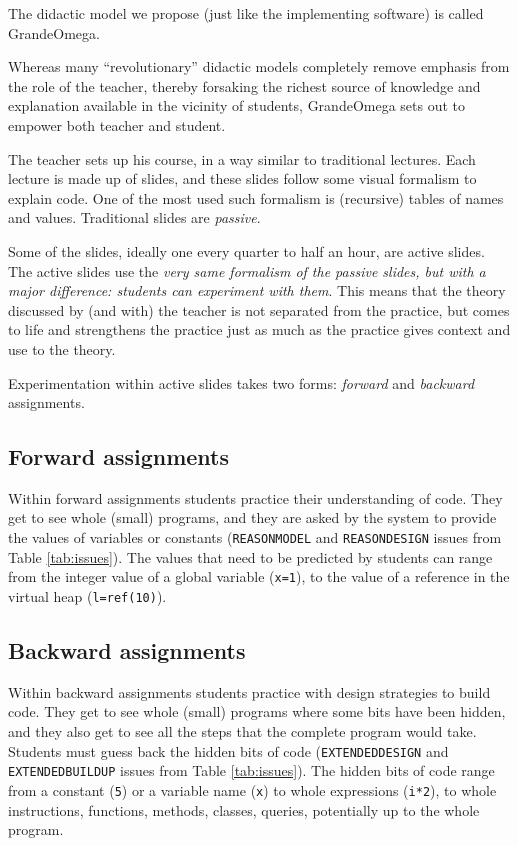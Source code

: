 The didactic model we propose (just like the implementing software) is called GrandeOmega.

Whereas many “revolutionary” didactic models completely remove emphasis from the role of the teacher, thereby forsaking the richest source of knowledge and explanation available in the vicinity of students, GrandeOmega sets out to empower both teacher and student. 

The teacher sets up his course, in a way similar to traditional lectures. Each lecture is made up of slides, and these slides follow some visual formalism to explain code. One  of the most used such formalism is (recursive) tables of names and values. Traditional slides are \textit{passive}.

Some of the slides, ideally one every quarter to half an hour, are active slides. The active slides use the \textit{very same formalism of the passive slides, but with a major difference: students can experiment with them}. This means that the theory discussed by (and with) the teacher is not separated from the practice, but comes to life and strengthens the practice just as much as the practice gives context and use to the theory.

Experimentation within active slides takes two forms: \textit{forward} and \textit{backward} assignments.

\subsection{Forward assignments}
Within forward assignments students practice their understanding of code. They get to see whole (small) programs, and they are asked by the system to provide the values of variables or constants (\texttt{REASON\textunderscore MODEL} and \texttt{REASON\textunderscore DESIGN} issues from Table \ref{tab:issues}). The values that need to be predicted by students can range from the integer value of a global variable (\texttt{x=1}), to the value of a reference in the virtual heap (\texttt{l=ref(10)}).

\subsection{Backward assignments}
Within backward assignments students practice with design strategies to build code. They get to see whole (small) programs where some bits have been hidden, and they also get to see all the steps that the complete program would take. Students must guess back the hidden bits of code (\texttt{EXTENDED\textunderscore DESIGN} and \texttt{EXTENDED\textunderscore BUILDUP} issues from Table \ref{tab:issues}). The hidden bits of code range from a constant (\texttt{5}) or a variable name (\texttt{x}) to whole expressions (\texttt{i*2}), to whole instructions, functions, methods, classes, queries, potentially up to the whole program.

